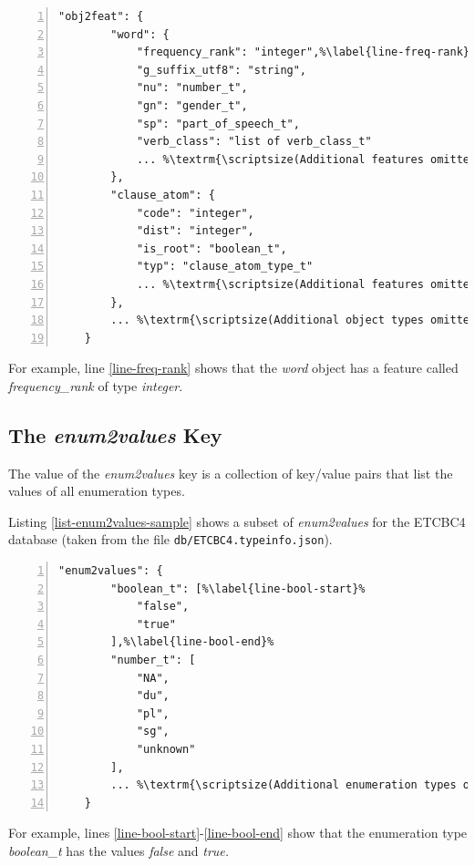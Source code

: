 \documentclass[11pt,oneside,a4paper]{memoir}
\begin{document}
\begin{lstlisting}[numbers=left,caption=A sample obj2feat value,label=list-obj2feat-sample]
    "obj2feat": {
        "word": {
            "frequency_rank": "integer",%\label{line-freq-rank}%
            "g_suffix_utf8": "string",
            "nu": "number_t",
            "gn": "gender_t",
            "sp": "part_of_speech_t",
            "verb_class": "list of verb_class_t"
            ... %\textrm{\scriptsize(Additional features omitted)}%
        },
        "clause_atom": {
            "code": "integer",
            "dist": "integer",
            "is_root": "boolean_t",
            "typ": "clause_atom_type_t"
            ... %\textrm{\scriptsize(Additional features omitted)}%
        },
        ... %\textrm{\scriptsize(Additional object types omitted)}%
    }
\end{lstlisting}

For example, line \ref{line-freq-rank} shows that the \emph{word} object has a feature called
\emph{frequency\_rank} of type \emph{integer}.

\subsection{The \emph{enum2values} Key}\label{enum2values}

The value of the \emph{enum2values} key is a collection of key/value pairs that list the values of
all enumeration types.

Listing \ref{list-enum2values-sample} shows a subset of \emph{enum2values} for the ETCBC4 database
(taken from the file \texttt{db/ETCBC4.typeinfo.json}).

\begin{lstlisting}[numbers=left,caption=A sample enum2values value,label=list-enum2values-sample]
    "enum2values": {
        "boolean_t": [%\label{line-bool-start}%
            "false",
            "true"
        ],%\label{line-bool-end}%
        "number_t": [
            "NA",
            "du",
            "pl",
            "sg",
            "unknown"
        ],
        ... %\textrm{\scriptsize(Additional enumeration types omitted)}%
    }
\end{lstlisting}

For example, lines \ref{line-bool-start}-\ref{line-bool-end} show that the enumeration type
\emph{boolean\_t} has the values \emph{false} and \emph{true.}



\end{document}

